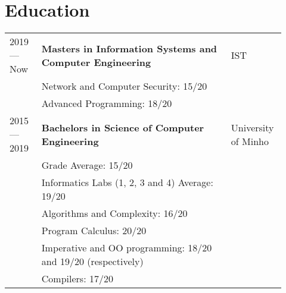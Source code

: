 \documentclass{article}
\begin{document}
\section{Education}

\begin{tabular}{p{0.11\linewidth}p{0.65\linewidth}p{0.16\linewidth}}

    2019 --- Now & \textbf{Masters in Information Systems and Computer
    Engineering} & IST\\
    & Network and Computer Security: 15/20 &\\
    & Advanced Programming: 18/20 &\\

    2015 --- 2019 & \textbf{Bachelors in Science of Computer Engineering} &
    University of Minho\\
    & Grade Average: 15/20 &\\
    & Informatics Labs (1, 2, 3 and 4) Average: 19/20 & \\
    & Algorithms and Complexity: 16/20 & \\
    & Program Calculus: 20/20 & \\
    & Imperative and OO programming: 18/20 and 19/20 (respectively) &\\
    & Compilers: 17/20 &\\

\end{tabular}


\end{document}
